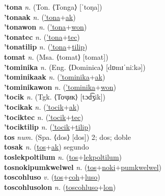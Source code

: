 \textbf{'tona} \textit{n.} (Ton. ⟨Tonga⟩ [ˈtoŋa])
 \label{'tona} \\
\textbf{'tonaak} \textit{n.} (\hyperref['tona]{'tona}+\hyperref[ak]{ak})
 \label{'tonaak} \\
\textbf{'tonawon} \textit{n.} (\hyperref['tona]{'tona}+\hyperref[won]{won})
 \label{'tonawon} \\
\textbf{'tonatec} \textit{n.} (\hyperref['tona]{'tona}+\hyperref[tec]{tec})
 \label{'tonatec} \\
\textbf{'tonatilip} \textit{n.} (\hyperref['tona]{'tona}+\hyperref[tilip]{tilip})
 \label{'tonatilip} \\
\textbf{tomat} \textit{n.} (Msa. ⟨tomat⟩ [tomat])
 \label{tomat} \\
\textbf{'tominika} \textit{n.} (Eng. ⟨Dominica⟩ [dɒmɪˈniːkə])
 \label{'tominika} \\
\textbf{'tominikaak} \textit{n.} (\hyperref['tominika]{'tominika}+\hyperref[ak]{ak})
 \label{'tominikaak} \\
\textbf{'tominikawon} \textit{n.} (\hyperref['tominika]{'tominika}+\hyperref[won]{won})
 \label{'tominikawon} \\
\textbf{'tocik} \textit{n.} (Tgk. ⟨Тоҷик⟩ [tɔd͡ʒik])
 \label{'tocik} \\
\textbf{'tocikak} \textit{n.} (\hyperref['tocik]{'tocik}+\hyperref[ak]{ak})
 \label{'tocikak} \\
\textbf{'tociktec} \textit{n.} (\hyperref['tocik]{'tocik}+\hyperref[tec]{tec})
 \label{'tociktec} \\
\textbf{'tociktilip} \textit{n.} (\hyperref['tocik]{'tocik}+\hyperref[tilip]{tilip})
 \label{'tociktilip} \\
\textbf{tos} \textit{num.} (Spa. ⟨dos⟩ [dos])
2; dos; doble \label{tos} \\
\textbf{tosak} \textit{n.} (\hyperref[tos]{tos}+\hyperref[ak]{ak})
segundo \label{tosak} \\
\textbf{toslekpoltilum} \textit{n.} (\hyperref[tos]{tos}+\hyperref[lekpoltilum]{lekpoltilum})
 \label{toslekpoltilum} \\
\textbf{tosnokipumkwelwel} \textit{n.} (\hyperref[tos]{tos}+\hyperref[noki]{noki}+\hyperref[pumkwelwel]{pumkwelwel})
 \label{tosnokipumkwelwel} \\
\textbf{toscohluso} \textit{v.} (\hyperref[tos]{tos}+\hyperref[coh]{coh}+\hyperref[luso]{luso})
 \label{toscohluso} \\
\textbf{toscohlusolon} \textit{n.} (\hyperref[toscohluso]{toscohluso}+\hyperref[lon]{lon})
 \label{toscohlusolon} \\
